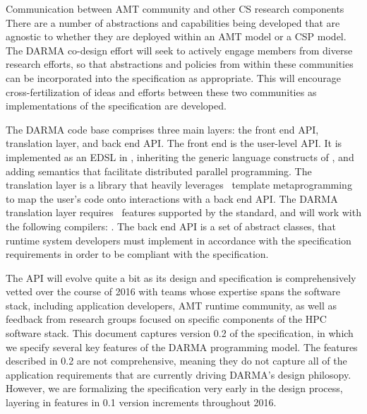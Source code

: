 \begin{compactdesc}
\item[Communication between AMT community and other CS research components]
There are a number of abstractions and capabilities being developed that are
agnostic to whether they are deployed within an \gls{AMT} model or a \gls{CSP} model.
The DARMA co-design effort will seek to actively engage members from diverse
research efforts, so that abstractions and policies from within these communities can be
incorporated into the specification as appropriate.
 This will encourage cross-fertilization of ideas and efforts between these two
 communities as implementations of the specification are developed.
\end{compactdesc}

The DARMA code base comprises three main layers: the \gls{front end} \gls{API},
\gls{translation layer}, and
\gls{back end} \gls{API}.  The \gls{front end} is the user-level \gls{API}.  It
is implemented as an \gls{EDSL} in \CC,  inheriting the generic language
constructs of \CC, and adding \gls{semantics} that facilitate distributed
parallel programming.
The \gls{translation layer} is a library that heavily leverages \CC\ \gls{template metaprogramming} 
to map the user's code onto interactions with a \gls{back end} \gls{API}.  
The DARMA \gls{translation layer} requires \CC\ features supported by the 
standard, and will work with the following compilers: .
The \gls{back end} \gls{API} is a set of abstract classes, that runtime system
developers must implement in accordance with the specification requirements in
order to be compliant with the specification.

The \gls{API} will evolve quite a bit as its design and specification is comprehensively vetted over
the course of 2016 with teams whose expertise spans the software stack,
including application
developers, \gls{AMT} runtime community, as well as feedback from
research groups focused on specific components of the \gls{HPC} software stack.
This document captures version 0.2 of the specification, in which we 
specify several key features of the DARMA programming model. The features
described in 0.2 are not comprehensive, meaning they do not capture all of the
application requirements that are currently driving DARMA's design philosopy. 
However, we are formalizing the specification very early in the
design process, layering in features in 0.1 version increments throughout 2016.




